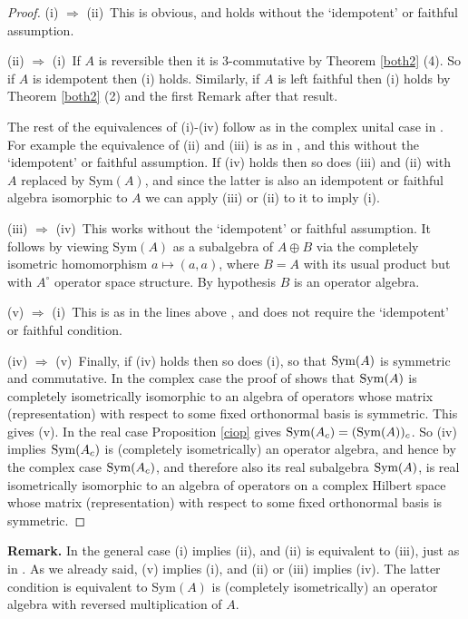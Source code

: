 \documentclass{amsart}
\theoremstyle{remark}
\theoremstyle{definition}
\numberwithin{equation}{section}
\begin{document}
  \begin{proof}  (i) $\Rightarrow$ (ii)\ This is obvious, and holds without the `idempotent'  or faithful assumption.   
  
  (ii) $\Rightarrow$ (i)\ If $A$  is reversible
  then it is 3-commutative by Theorem \ref{both2} (4). 
  So if $A$ is idempotent then (i) holds.
  Similarly, if $A$ is left faithful then (i) holds by Theorem \ref{both2} (2) and the first Remark  after that result.  
  
  The rest of the equivalences of (i)-(iv) follow as in the complex unital case in \cite{BComm}.
  For example the equivalence of (ii) and (iii) is  as in \cite{BComm}, and this  without the `idempotent'  or faithful assumption. 
  If (iv) holds
  then so does (iii) and (ii) with $A$ replaced by {\rm Sym}$(A)$, and since the latter is also an idempotent 
  or faithful algebra isomorphic to $A$ 
  we can  apply (iii) or (ii) to it to  imply  (i).  
  
  (iii)  $\Rightarrow$ (iv)\ This works without the `idempotent'  or faithful assumption. 
It follows   by viewing Sym$(A)$ as a subalgebra of $A \oplus B$ via the 
completely isometric homomorphism $a \mapsto (a,a)$, where $B = A$ with its usual product but with $A^{\circ}$ operator space structure.   
By hypothesis $B$ is an operator algebra. 
  
(v) $\Rightarrow$ (i)\ This is as in the lines above  \cite[Corollary 2.5]{BWinv}, and does not require the `idempotent' or faithful condition.   

(iv) $\Rightarrow$ (v)\ Finally, if (iv) holds then so does (i), so that ${\rm Sym}(A)$ is symmetric and commutative. 
  In the complex case the proof of \cite[Corollary 2.5]{BWinv} 
  shows that ${\rm Sym}(A)$ is completely 
  isometrically isomorphic to an algebra of 
 operators whose matrix (representation) with respect to some fixed orthonormal basis is 
symmetric.  This gives (v).  In the real case Proposition \ref{ciop} gives 
${\rm Sym}(A_c) = ({\rm Sym}(A))_c$.  So (iv) implies ${\rm Sym}(A_c)$ 
is (completely isometrically) an operator algebra, and hence by the complex case 
${\rm Sym}(A_c)$, and therefore also its real subalgebra ${\rm Sym}(A)$, is real isometrically isomorphic to an algebra of 
 operators on a complex Hilbert space whose matrix (representation) with respect to some fixed orthonormal basis is 
symmetric. 
\end{proof} 

{\bf Remark.}  In the general case (i) implies (ii), and (ii) is equivalent to (iii), just as in  \cite{BComm}.   As we already said, (v) implies (i), and  (ii) or (iii) implies (iv). 
The latter condition is equivalent to {\rm Sym}$(A)$ is (completely isometrically) an operator algebra with reversed  multiplication of $A$. 
\end{document}
